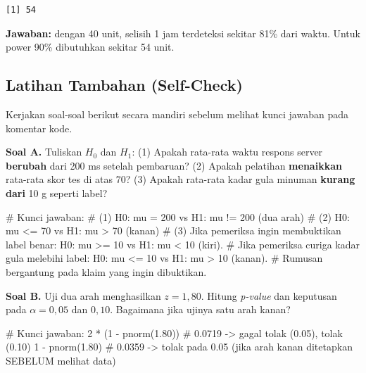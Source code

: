 \documentclass[
  indonesian,
  letterpaper,
]{book}
\newenvironment{Shaded}{\begin{snugshade}}{\end{snugshade}}
\newcommand{\CommentTok}[1]{\textcolor[rgb]{0.37,0.37,0.37}{#1}}
\newcommand{\DecValTok}[1]{\textcolor[rgb]{0.68,0.00,0.00}{#1}}
\newcommand{\FloatTok}[1]{\textcolor[rgb]{0.68,0.00,0.00}{#1}}
\newcommand{\FunctionTok}[1]{\textcolor[rgb]{0.28,0.35,0.67}{#1}}
\newcommand{\NormalTok}[1]{\textcolor[rgb]{0.00,0.23,0.31}{#1}}
\newcommand{\SpecialCharTok}[1]{\textcolor[rgb]{0.37,0.37,0.37}{#1}}
\begin{document}
\begin{verbatim}
[1] 54
\end{verbatim}

\textbf{Jawaban:} dengan 40 unit, selisih 1 jam terdeteksi sekitar 81\%
dari waktu. Untuk power 90\% dibutuhkan sekitar 54 unit.

\subsection{Latihan Tambahan
(Self-Check)}\label{latihan-tambahan-self-check-1}

Kerjakan soal-soal berikut secara mandiri sebelum melihat kunci jawaban
pada komentar kode.

\textbf{Soal A.} Tuliskan \(H_0\) dan \(H_1\): (1) Apakah rata-rata
waktu respons server \textbf{berubah} dari 200 ms setelah pembaruan? (2)
Apakah pelatihan \textbf{menaikkan} rata-rata skor tes di atas 70? (3)
Apakah rata-rata kadar gula minuman \textbf{kurang dari} 10 g seperti
label?

\begin{Shaded}
\begin{Highlighting}[]
\CommentTok{\# Kunci jawaban:}
\CommentTok{\# (1) H0: mu = 200 vs H1: mu != 200 (dua arah)}
\CommentTok{\# (2) H0: mu \textless{}= 70 vs H1: mu \textgreater{} 70 (kanan)}
\CommentTok{\# (3) Jika pemeriksa ingin membuktikan label benar: H0: mu \textgreater{}= 10 vs H1: mu \textless{} 10 (kiri).}
\CommentTok{\#     Jika pemeriksa curiga kadar gula melebihi label: H0: mu \textless{}= 10 vs H1: mu \textgreater{} 10 (kanan).}
\CommentTok{\#     Rumusan bergantung pada klaim yang ingin dibuktikan.}
\end{Highlighting}
\end{Shaded}

\textbf{Soal B.} Uji dua arah menghasilkan \(z = 1{,}80\). Hitung
\emph{p-value} dan keputusan pada \(\alpha = 0{,}05\) dan \(0{,}10\).
Bagaimana jika ujinya satu arah kanan?

\begin{Shaded}
\begin{Highlighting}[]
\CommentTok{\# Kunci jawaban:}
\DecValTok{2} \SpecialCharTok{*}\NormalTok{ (}\DecValTok{1} \SpecialCharTok{{-}} \FunctionTok{pnorm}\NormalTok{(}\FloatTok{1.80}\NormalTok{))   }\CommentTok{\# 0.0719 {-}\textgreater{} gagal tolak (0.05), tolak (0.10)}
\DecValTok{1} \SpecialCharTok{{-}} \FunctionTok{pnorm}\NormalTok{(}\FloatTok{1.80}\NormalTok{)         }\CommentTok{\# 0.0359 {-}\textgreater{} tolak pada 0.05 (jika arah kanan ditetapkan SEBELUM melihat data)}
\end{Highlighting}
\end{Shaded}
\end{document}
